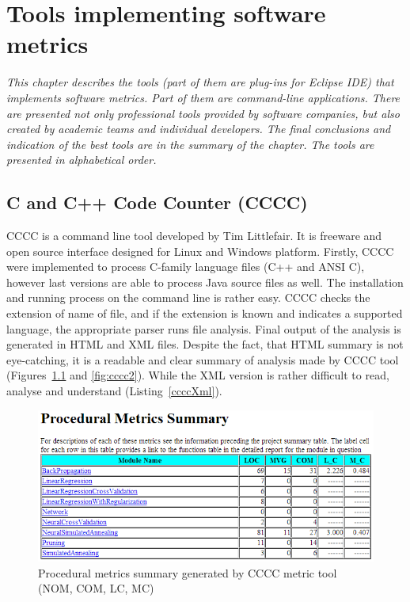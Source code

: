 \chapter{Tools implementing software metrics} \label{roz:metrics-tools}

\textit{This chapter describes the tools (part of them are plug-ins for Eclipse IDE) that implements software metrics. Part of them are command-line applications. There are presented not only professional tools provided by software companies, but also created by academic teams and individual developers. The final conclusions and indication of the best tools are in the summary of the chapter. The tools are presented in alphabetical order.} 

\section{C and C++ Code Counter (CCCC)}
CCCC is a command line tool developed by Tim Littlefair. It is freeware and open source interface designed for Linux and Windows platform. Firstly, CCCC were implemented to process C-family language files (C++ and ANSI C), however last versions are able to process Java source files as well. The installation and running process on the command line is rather easy. CCCC checks the extension of name of file, and if the extension is known and indicates a supported language, the appropriate parser runs file analysis. Final output of the analysis is generated in HTML and XML files. Despite the fact, that HTML summary is not eye-catching, it is a readable and clear summary of analysis made by CCCC tool (Figures~\ref{fig:cccc1} and \ref{fig:cccc2}). While the XML version is rather difficult to read, analyse and understand (Listing~\ref{ccccXml}). 

\begin{figure}[h!]
	\centering
	\includegraphics[scale=0.6]{img/cccc1.png} 
	\caption{Procedural metrics summary generated by CCCC metric tool (\ac{NOM}, \ac{COM}, \ac{LC}, \ac{MC})}		
	\label{fig:cccc1}
\end{figure}

